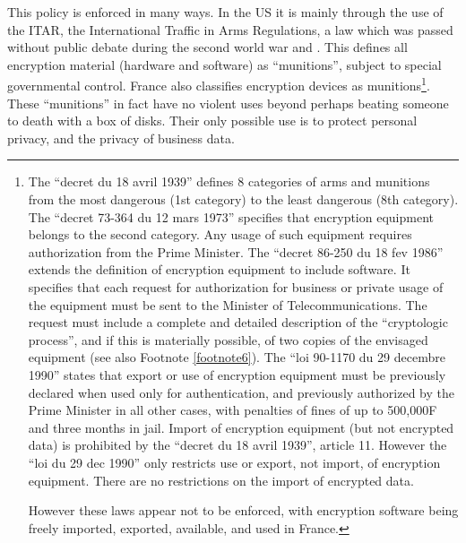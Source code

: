 This policy is enforced in many ways.  In the US it is mainly through the use
of the ITAR, the International Traffic in Arms Regulations, a law which was
passed without public debate during the second world war and .  This defines all
encryption material (hardware and software) as ``munitions'', subject to special
governmental control.  France also classifies encryption devices as
munitions\footnote{
               The ``decret du 18 avril 1939'' defines 8 categories of arms and
               munitions from the most dangerous (1st category) to the least
               dangerous (8th category).  The ``decret 73-364 du 12 mars 1973''
               specifies that encryption equipment belongs to the second
               category.  Any usage of such equipment requires authorization
               from the Prime Minister.  The ``decret 86-250 du 18 fev 1986''
               extends the definition of encryption equipment to include
               software.  It specifies that each request for authorization for
               business or private usage of the equipment must be sent to the
               Minister of Telecommunications.  The request must include a
               complete and detailed description of the ``cryptologic process'',
               and if this is materially possible, of two copies of the
               envisaged equipment (see also Footnote \ref{footnote6}).  The ``loi 90-1170 du
               29 decembre 1990'' states that export or use of encryption
               equipment must be previously declared when used only for
               authentication, and previously authorized by the Prime Minister
               in all other cases, with penalties of fines of up to 500,000F and
               three months in jail.  Import of encryption equipment (but not
               encrypted data) is prohibited by the ``decret du 18 avril 1939'',
               article 11.  However the ``loi du 29 dec 1990'' only restricts use
               or export, not import, of encryption equipment.  There are no
               restrictions on the import of encrypted data.
 
               However these laws appear not to be enforced, with encryption
               software being freely imported, exported, available, and used in
               France.
}.  These ``munitions'' in fact have no violent uses beyond perhaps
beating someone to death with a box of disks.  Their only possible use is to 
protect personal privacy, and the privacy of business data.

